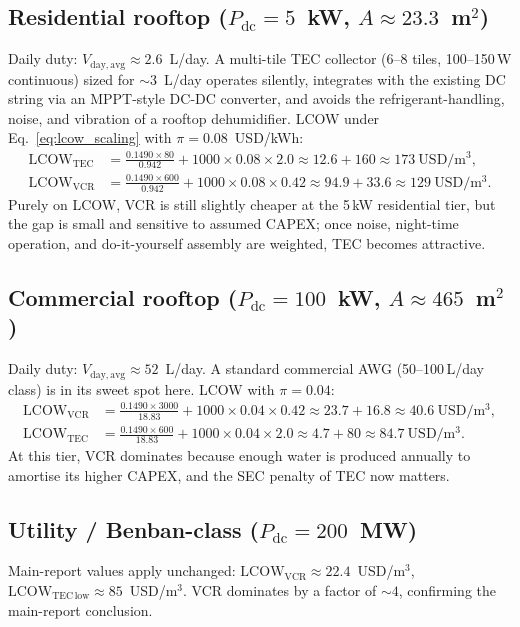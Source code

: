 \documentclass[11pt,a4paper]{article}
\begin{document}
\subsection{Residential rooftop ($P_{\mathrm{dc}}=5$~kW, $A\approx 23.3$~m$^2$)}
Daily duty: $V_{\mathrm{day,avg}}\approx 2.6$~L/day. A multi-tile TEC collector (6--8 tiles, 100--150\,W continuous) sized for $\sim$3~L/day operates silently, integrates with the existing DC string via an MPPT-style DC-DC converter, and avoids the refrigerant-handling, noise, and vibration of a rooftop dehumidifier. LCOW under Eq.~\eqref{eq:lcow_scaling} with $\pi=0.08$~USD/kWh:
\begin{align*}
\mathrm{LCOW}_{\mathrm{TEC}}&=\frac{0.1490\times 80}{0.942}+1000\times 0.08\times 2.0
\approx 12.6+160\approx \boxed{173~\mathrm{USD/m^3}},\\
\mathrm{LCOW}_{\mathrm{VCR}}&=\frac{0.1490\times 600}{0.942}+1000\times 0.08\times 0.42
\approx 94.9+33.6\approx \boxed{129~\mathrm{USD/m^3}}.
\end{align*}
Purely on LCOW, VCR is still slightly cheaper at the 5\,kW residential tier, but the gap is small and sensitive to assumed CAPEX; once noise, night-time operation, and do-it-yourself assembly are weighted, TEC becomes attractive.

\subsection{Commercial rooftop ($P_{\mathrm{dc}}=100$~kW, $A\approx 465$~m$^2$)}
Daily duty: $V_{\mathrm{day,avg}}\approx 52$~L/day. A standard commercial AWG (50--100\,L/day class) is in its sweet spot here. LCOW with $\pi=0.04$:
\begin{align*}
\mathrm{LCOW}_{\mathrm{VCR}}&=\frac{0.1490\times 3000}{18.83}+1000\times 0.04\times 0.42
\approx 23.7+16.8\approx \boxed{40.6~\mathrm{USD/m^3}},\\
\mathrm{LCOW}_{\mathrm{TEC}}&=\frac{0.1490\times 600}{18.83}+1000\times 0.04\times 2.0
\approx 4.7+80\approx \boxed{84.7~\mathrm{USD/m^3}}.
\end{align*}
At this tier, VCR dominates because enough water is produced annually to amortise its higher CAPEX, and the SEC penalty of TEC now matters.

\subsection{Utility / Benban-class ($P_{\mathrm{dc}}=200$~MW)}
Main-report values apply unchanged: $\mathrm{LCOW}_{\mathrm{VCR}}\approx 22.4$~USD/m$^3$, $\mathrm{LCOW}_{\mathrm{TEC\,low}}\approx 85$~USD/m$^3$. VCR dominates by a factor of $\sim 4$, confirming the main-report conclusion.
\end{document}
